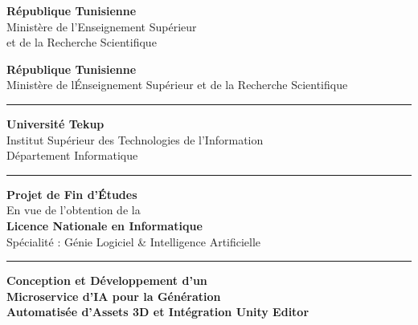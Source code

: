 \documentclass[12pt,a4paper,oneside]{report}
\begin{document}
\setcounter{page}{0}

\begin{titlepage}
\thispagestyle{empty}\centering

\begin{minipage}[t]{0.45\linewidth}\raggedright
\small\textbf{République Tunisienne}\\
Ministère de l'Enseignement Supérieur\\
et de la Recherche Scientifique
\end{minipage}\hfill
\begin{minipage}[t]{0.45\linewidth}\raggedleft
\small\textbf{R\'epublique Tunisienne}\\
Minist\`ere de l\'Enseignement Sup\'erieur et de la Recherche Scientifique
\end{minipage}

\vspace{0.3cm}\rule{\linewidth}{1.5pt}

\vspace{0.3cm}
{\large\bfseries\color{tekupblue} Université Tekup}\\[2pt]
{\normalsize Institut Supérieur des Technologies de l'Information}\\[2pt]
{\small Département Informatique}

\vspace{0.4cm}\rule{\linewidth}{0.6pt}\vspace{0.3cm}

{\Large\bfseries Projet de Fin d'Études}\\[3pt]
{\normalsize En vue de l'obtention de la}\\[2pt]
{\large\bfseries Licence Nationale en Informatique}\\[2pt]
{\normalsize Spécialité : Génie Logiciel \& Intelligence Artificielle}

\vspace{0.5cm}\rule{0.6\linewidth}{0.8pt}\vspace{0.4cm}

{\color{tekupblue}\LARGE\bfseries
Conception et Développement d'un\\[6pt]
Microservice d'IA pour la Génération\\[6pt]
Automatisée d'Assets 3D et Intégration Unity Editor
}


\end{titlepage}
\end{document}
